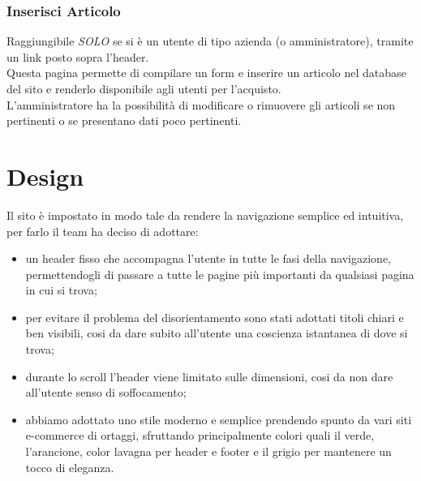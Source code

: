 	\subsubsection{Inserisci Articolo}
	Raggiungibile \textit{SOLO} se si è un utente di tipo azienda (o amministratore), tramite un link posto sopra l'header.\\ Questa pagina permette di compilare un form e inserire un articolo nel database del sito e renderlo disponibile agli utenti per l'acquisto.\\
	L'amministratore ha la possibilità di modificare o rimuovere gli articoli se non pertinenti o se presentano dati poco pertinenti.


\section{Design}
	Il sito è impostato in modo tale da rendere la navigazione semplice ed intuitiva, per farlo il team ha deciso di adottare:
	\begin{itemize}
		\item un header fisso che accompagna l'utente in tutte le fasi della navigazione, permettendogli di passare a tutte le pagine più importanti da qualsiasi pagina in cui si trova;
		\item per evitare il problema del disorientamento sono stati adottati titoli chiari e ben visibili, cosi da dare subito all'utente una coscienza istantanea di dove si trova;
		\item durante lo scroll l'header viene limitato sulle dimensioni, cosi da non dare all'utente senso di soffocamento;
		\item abbiamo adottato uno stile moderno e semplice prendendo spunto da vari siti e-commerce di ortaggi, sfruttando principalmente colori quali il verde, l'arancione, color lavagna per header e footer e il grigio per mantenere un tocco di eleganza.
	\end{itemize} 
	
	

